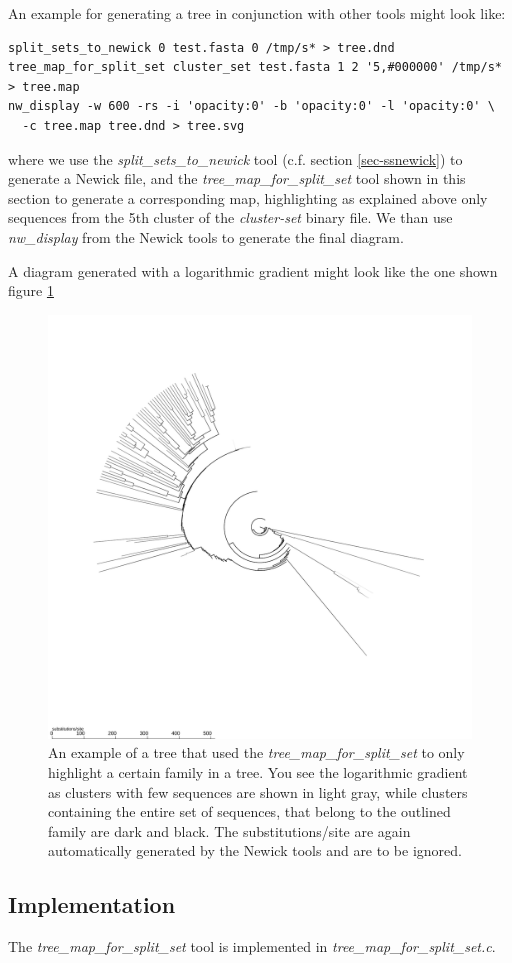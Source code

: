 An example for generating a tree in conjunction with other tools might
look like:
\begin{lstlisting}
split_sets_to_newick 0 test.fasta 0 /tmp/s* > tree.dnd
tree_map_for_split_set cluster_set test.fasta 1 2 '5,#000000' /tmp/s* > tree.map
nw_display -w 600 -rs -i 'opacity:0' -b 'opacity:0' -l 'opacity:0' \
  -c tree.map tree.dnd > tree.svg
\end{lstlisting}
where we use the \emph{split\_sets\_to\_newick} tool (c.f. section
\ref{sec-ssnewick}) to generate a
Newick file, and the \emph{tree\_map\_for\_split\_set} tool shown in
this section to generate a corresponding map, highlighting as
explained above only sequences from the 5th cluster of the
\emph{cluster-set} binary file. We than use \emph{nw\_display} from
the Newick tools \cite{newick_tools} to generate the final diagram.

A diagram generated with a logarithmic gradient might look like the one
shown figure \ref{fig-treemapset}

\begin{figure}
  \includegraphics[scale=0.6]{tree-clust.pdf}
  \caption{An example of a tree that used the
    \emph{tree\_map\_for\_split\_set} to only highlight a certain
    family in a tree. You see the logarithmic gradient as clusters
    with few sequences are shown in light gray, while clusters
    containing the entire set of sequences, that belong to the
    outlined family are dark and black. The substitutions/site are
    again automatically generated by the Newick tools
    \cite{newick_tools} and are to be ignored.}
  \label{fig-treemapset}
\end{figure}

\subsection{Implementation}
The \emph{tree\_map\_for\_split\_set} tool is implemented in \newline
\emph{tree\_map\_for\_split\_set.c}.



        
